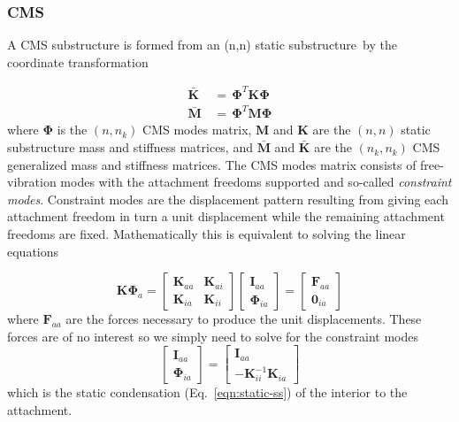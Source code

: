 \documentclass[10pt,openany,twoside]{book}
\numberwithin{equation}{section}   %
\newcommand{\Newterm}[1]{{\em #1}}
\newcommand{\Matrix}[1]{\boldsymbol{#1}}
\newcommand{\Eqn}[1]{Eq.\ \ref{#1}}
\newcommand{\Ss}{substructure}
\begin{document}
\subsubsection{CMS}
\par
A CMS substructure is formed from an (n,n) static \Ss\
by the coordinate transformation

\begin{equation}\label{eqn:dsstrans}
\begin{split}
\Matrix{\bar{K}} & \, = \, \Matrix{\Phi}^T \Matrix{K} \Matrix{\Phi} \\
\Matrix{\bar{M}} & \, = \, \Matrix{\Phi}^T \Matrix{M} \Matrix{\Phi}
\end{split}
\end{equation}
where $\Matrix{\Phi}$ is the $(n,n_k )$ CMS modes matrix,
$\Matrix{M}$ and $\Matrix{K}$
are the $(n,n)$ static substructure mass and stiffness matrices, and
$\Matrix{\bar{M}}$ and $\Matrix{\bar{K}}$ are the $(n_k , n_k)$
CMS generalized mass and stiffness matrices.
The CMS modes matrix consists of free-vibration
modes with the attachment freedoms supported and so-called
\Newterm{constraint modes}.
Constraint modes are the displacement pattern resulting
from  giving each attachment freedom in turn a unit displacement while
the remaining attachment freedoms are fixed.
Mathematically this is equivalent to solving the linear equations

\begin{equation}\label{eqn:dsslineqn}
\Matrix{K}\Matrix{\Phi}_a = \left[
\begin{array}{cc}
   \Matrix{K}_{aa} & \Matrix{K}_{ai} \\
   \Matrix{K}_{ia} & \Matrix{K}_{ii}
\end{array}
\right] \left[
\begin{array}{c}
   \Matrix{I}_{aa} \\
   \Matrix{\Phi}_{ia}
\end{array}
\right] = \left[
\begin{array}{c}
   \Matrix{F}_{aa} \\
   \Matrix{0}_{ia}
\end{array}
\right]
\end{equation}
\index{=Phi@$\Matrix{\Phi}$!modal synthesis}
where $\Matrix{F}_{aa}$ are the forces necessary to produce the unit
displacements. These forces are of no interest so we simply need to solve
for the constraint modes
\begin{equation}\label{eqn:constraint}
	\left[ \begin{array}{c}
		\Matrix{I}_{aa} \\
		\Matrix{\Phi}_{ia}
	\end{array} \right] =
	\left[ \begin{array}{c}
		\Matrix{I}_{aa} \\
		-\Matrix{K}_{ii}^{-1} \Matrix{K}_{ia}
	\end{array} \right]
\end{equation}
which is the static condensation (\Eqn{eqn:static-ss}) of the interior to the attachment.
\end{document}
